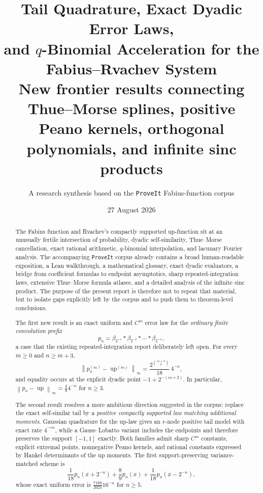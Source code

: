 \documentclass[11pt]{article}
\title{\textbf{Tail Quadrature, Exact Dyadic Error Laws,\\
and $q$-Binomial Acceleration for the Fabius--Rvachev System}\\[0.65em]
\large New frontier results connecting Thue--Morse splines, positive Peano kernels, orthogonal polynomials, and infinite sinc products}
\author{A research synthesis based on the \texttt{ProveIt} Fabius-function corpus}
\date{27 August 2026}
\numberwithin{equation}{section}
\theoremstyle{definition}
\theoremstyle{remark}
\newcommand{\Up}{\operatorname{up}}
\newcommand{\norm}[1]{\left\lVert#1\right\rVert}
\begin{document}
\maketitle

\begin{abstract}
The Fabius function and Rvachev's compactly supported up-function sit at an unusually fertile intersection of probability, dyadic self-similarity, Thue--Morse cancellation, exact rational arithmetic, $q$-binomial interpolation, and lacunary Fourier analysis.  The accompanying \texttt{ProveIt} corpus already contains a broad human-readable exposition, a Lean walkthrough, a mathematical glossary, exact dyadic evaluators, a bridge from coefficient formulas to endpoint asymptotics, sharp repeated-integration laws, extensive Thue--Morse formula atlases, and a detailed analysis of the infinite sinc product.  The purpose of the present report is therefore not to repeat that material, but to isolate gaps explicitly left by the corpus and to push them to theorem-level conclusions.

The first new result is an exact uniform and $C^m$ error law for the \emph{ordinary finite convolution prefix}
\[
 p_n=\beta_{2^{-1}}*\beta_{2^{-2}}*\cdots*\beta_{2^{-n}},
\]
a case that the existing repeated-integration report deliberately left open.  For every $m\ge0$ and $n\ge m+3$,
\[
 \norm{p_n^{(m)}-\Up^{(m)}}_\infty
 =\frac{2^{\binom{m+3}{2}}}{18}\,4^{-n},
\]
and equality occurs at the explicit dyadic point $-1+2^{-(m+2)}$.  In particular,
\(\norm{p_n-\Up}_\infty=\frac49 4^{-n}\) for $n\ge3$.

The second result resolves a more ambitious direction suggested in the corpus: replace the exact self-similar tail by a \emph{positive compactly supported law matching additional moments}.  Gaussian quadrature for the up-law gives an $r$-node positive tail model with exact rate $4^{-rn}$, while a Gauss--Lobatto variant includes the endpoints and therefore preserves the support $[-1,1]$ exactly.  Both families admit sharp $C^m$ constants, explicit extremal points, nonnegative Peano kernels, and rational constants expressed by Hankel determinants of the up moments.  The first support-preserving variance-matched scheme is
\[
 \frac1{18}p_n(x+2^{-n})+\frac89p_n(x)+\frac1{18}p_n(x-2^{-n}),
\]
whose exact uniform error is \(\frac{7168}{2025}16^{-n}\) for $n\ge5$.


\end{abstract}
\end{document}
